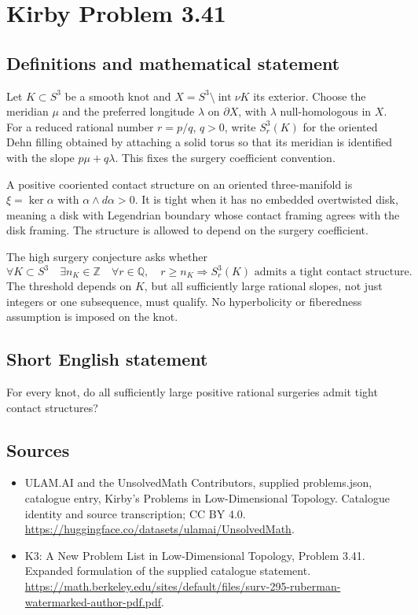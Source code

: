 \documentclass[11pt,a4paper]{article}
\begin{document}
\section*{Kirby Problem 3.41}\label{statement}

\subsection{Definitions and mathematical statement}
Let $K\subset S^3$ be a smooth knot and $X=S^3\setminus\operatorname{int}\nu K$
its exterior. Choose the meridian $\mu$ and the preferred longitude $\lambda$
on $\partial X$, with $\lambda$ null-homologous in $X$. For a reduced rational
number $r=p/q$, $q>0$, write $S^3_r(K)$ for the oriented Dehn filling
obtained by attaching a solid torus so that its meridian is identified with
the slope $p\mu+q\lambda$. This fixes the surgery coefficient convention.

A positive cooriented contact structure on an oriented three-manifold is
$\xi=\ker\alpha$ with $\alpha\wedge d\alpha>0$. It is tight when it has
no embedded overtwisted disk, meaning a disk with Legendrian boundary whose
contact framing agrees with the disk framing. The structure is allowed to
depend on the surgery coefficient.

The high surgery conjecture asks whether
\[
 \forall K\subset S^3\quad\exists n_K\in\mathbb Z\quad
 \forall r\in\mathbb Q,
 \quad r\geq n_K\Longrightarrow
 S^3_r(K)\text{ admits a tight contact structure}.
\]
The threshold depends on $K$, but all sufficiently large rational slopes,
not just integers or one subsequence, must qualify. No hyperbolicity or
fiberedness assumption is imposed on the knot.
\subsection{Short English statement}
For every knot, do all sufficiently large positive rational surgeries admit tight contact structures?
\subsection{Sources}
\begin{itemize}
\item[S1] ULAM.AI and the UnsolvedMath Contributors, supplied problems.json, catalogue entry, Kirby's Problems in Low-Dimensional Topology. Catalogue identity and source transcription; CC BY 4.0.
\url{https://huggingface.co/datasets/ulamai/UnsolvedMath}.
\item[S2] K3: A New Problem List in Low-Dimensional Topology, Problem 3.41. Expanded formulation of the supplied catalogue statement.
\url{https://math.berkeley.edu/sites/default/files/surv-295-ruberman-watermarked-author-pdf.pdf}.
\end{itemize}
\end{document}
